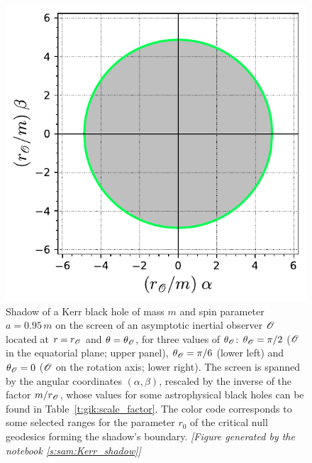 \begin{figure}
\begin{center}
\includegraphics[height=0.28\textheight]{gik_shadow_a95_th00.pdf}
\end{center}
\caption[]{\label{f:gik:shadow_a95} \footnotesize
Shadow of a Kerr black hole of mass $m$ and spin parameter $a=0.95\, m$ on the screen of an asymptotic
inertial observer $\mathscr{O}$ located at $r=r_{\mathscr{O}}$ and $\theta=\theta_{\mathscr{O}}$, for three
values of $\theta_{\mathscr{O}}$: $\theta_{\mathscr{O}} = \pi/2$ ($\mathscr{O}$ in the equatorial plane; upper panel),
$\theta_{\mathscr{O}} = \pi/6$ (lower left) and $\theta_{\mathscr{O}} = 0$ ($\mathscr{O}$ on the rotation axis; lower right).
The screen is spanned by the angular coordinates $(\alpha,\beta)$, rescaled by the inverse of
the factor $m/r_{\mathscr{O}}$, whose values for some astrophysical black holes can be found in Table~\ref{t:gik:scale_factor}.
The color code corresponds to some selected ranges for the parameter $r_0$
of the critical null geodesics forming the shadow's boundary.
\textsl{[Figure generated by the notebook \ref{s:sam:Kerr_shadow}]}
}
\end{figure}


